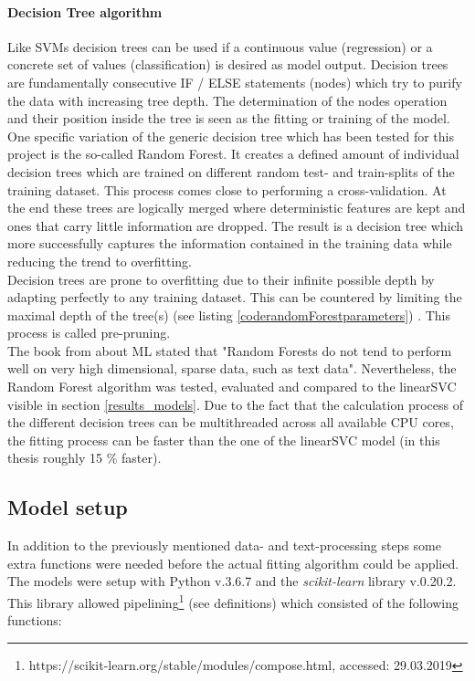 \paragraph*{Decision Tree algorithm}
Like SVMs decision trees can be used if a continuous value (regression) or a concrete set of values (classification) is desired as model output. Decision trees are fundamentally consecutive IF / ELSE statements (nodes) which try to purify the data with increasing tree depth. The determination of the nodes operation and their position inside the tree is seen as the fitting or training of the model.\\
One specific variation of the generic decision tree which has been tested for this project is the so-called Random Forest. It creates a defined amount of individual decision trees which are trained on different random test- and train-splits of the training dataset. This process comes close to performing a cross-validation. At the end these trees are logically merged where deterministic features are kept and ones that carry little information are dropped. The result is a decision tree which more successfully captures the information contained in the training data while reducing the trend to overfitting.\\
Decision trees are prone to overfitting due to their infinite possible depth by adapting perfectly to any training dataset. This can be countered by limiting the maximal depth of the tree(s) (see listing \ref{coderandomForestparameters}) . This process is called pre-pruning.\\
\newline
 The book from \textcite{Guido2016} about ML stated that "Random Forests do not tend to perform well on very high dimensional, sparse data, such as text data". Nevertheless, the Random Forest algorithm was tested, evaluated and compared to the linearSVC visible in section \ref{results_models}. Due to the fact that the calculation process of the different decision trees can be multithreaded across all available CPU cores, the fitting process can be faster than the one of the linearSVC model (in this thesis roughly 15 \% faster). 

\subsection{Model setup} \label{model_setup}
In addition to the previously mentioned data- and text-processing steps some extra functions were needed before the actual fitting algorithm could be applied. The models were setup with Python v.3.6.7 and the \textit{scikit-learn} library v.0.20.2. This library allowed pipelining\footnote{https://scikit-learn.org/stable/modules/compose.html, accessed: 29.03.2019} (see definitions) which consisted of the following functions:

